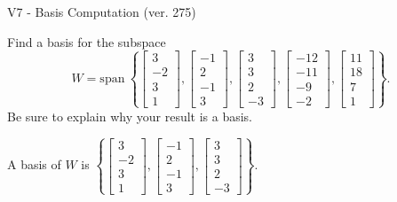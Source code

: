 \begin{exercise}
  \begin{exerciseTitle}V7 - Basis Computation (ver. 275)\end{exerciseTitle}
  \begin{exerciseStatement}
    Find a basis for the subspace 
\[W=\mathrm{span}\ \left\{\left[\begin{array}{r}
3 \\
-2 \\
3 \\
1
\end{array}\right] , \left[\begin{array}{r}
-1 \\
2 \\
-1 \\
3
\end{array}\right] , \left[\begin{array}{r}
3 \\
3 \\
2 \\
-3
\end{array}\right] , \left[\begin{array}{r}
-12 \\
-11 \\
-9 \\
-2
\end{array}\right] , \left[\begin{array}{r}
11 \\
18 \\
7 \\
1
\end{array}\right]\right\}.\]
 Be sure to explain why your result is a basis.


  \end{exerciseStatement}
  \begin{exerciseAnswer}
   A basis of \(W\) is  \(\left\{\left[\begin{array}{r}
3 \\
-2 \\
3 \\
1
\end{array}\right] , \left[\begin{array}{r}
-1 \\
2 \\
-1 \\
3
\end{array}\right] , \left[\begin{array}{r}
3 \\
3 \\
2 \\
-3
\end{array}\right]\right\}\).
  


  \end{exerciseAnswer}
\end{exercise}